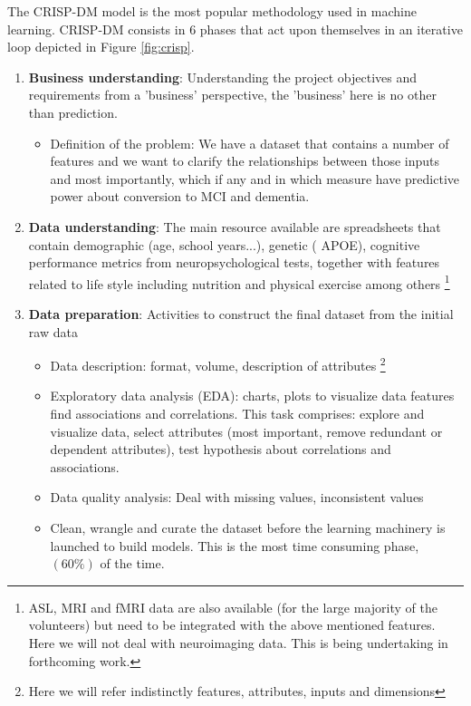 \documentclass[11pt]{article}
\theoremstyle{definition}
\theoremstyle{remark}
\begin{document}
The CRISP-DM model is the most popular methodology used in machine learning. CRISP-DM consists in 6 phases that act upon themselves in an iterative loop depicted in Figure \ref{fig:crisp}.
\begin{enumerate}
\item \textbf{Business understanding}: Understanding the project objectives and requirements from a 'business' perspective, the 'business' here is no other than prediction. 
	\begin{itemize}
		\item Definition of the problem: We have a dataset that contains a number of features and we want to clarify the relationships between those inputs and most importantly, which if any and in which measure have predictive power about conversion to MCI and dementia.
	\end{itemize}
\item \textbf{Data understanding}: The main resource available are spreadsheets that contain demographic (age, school years...), genetic ( APOE), cognitive performance metrics from neuropsychological tests, together with features related to life style including nutrition and physical exercise among others \footnote{ASL, MRI and fMRI data are also available (for the large majority of the volunteers) but need to be integrated with the above mentioned features. Here we will not deal with neuroimaging data. This is being undertaking in forthcoming work.}
\item \textbf{Data preparation}: Activities to construct the final dataset from the initial raw data
	\begin{itemize}
		\item Data description: format, volume, description of attributes \footnote{Here we will refer indistinctly features, attributes, inputs and dimensions}
		\item Exploratory data analysis (EDA): charts, plots to visualize data features find associations and correlations. This task comprises: explore and visualize data, select attributes (most important, remove redundant or dependent attributes), test hypothesis about correlations and associations.
		\item Data quality analysis: Deal with missing values, inconsistent values
		\item Clean, wrangle and curate the dataset before the learning machinery is launched to build models. This is the most time consuming phase, $(60\%)$ of the time.

\end{itemize}
\end{enumerate}
\end{document}
